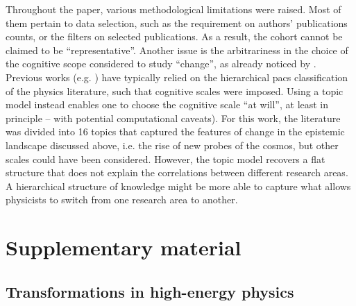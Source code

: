 \documentclass{article}
\begin{document}
Throughout the paper, various methodological limitations were raised. Most of them pertain to data selection, such as the requirement on authors' publications counts, or the filters on selected publications. As a result, the cohort cannot be claimed to be ``representative''. Another issue is the arbitrariness in the choice of the cognitive scope considered to study ``change'', as already noticed by \citet{Gieryn1978}. Previous works (e.g. \citealt{Tripodi2020,Aleta2019,Battiston2019,Jia2017}) have typically relied on the hierarchical \gls{pacs} classification of the physics literature, such that cognitive scales were imposed. Using a topic model instead enables one to choose the cognitive scale ``at will'', at least in principle -- with potential computational caveats). For this work, the literature was divided into 16 topics that captured the features of change in the epistemic landscape discussed above, i.e. the rise of new probes of the cosmos, but other scales could have been considered. However, the topic model recovers a flat structure that does not explain the correlations between different research areas. A hierarchical structure of knowledge might be more able to capture what allows physicists to switch from one research area to another.


\printbibliography

\newpage

\appendix

\section{Supplementary material}

\subsection{\label{appendix:landscape}Transformations in high-energy physics}
\end{document}
